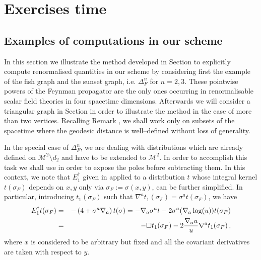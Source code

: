 \documentclass[10pt]{book}
\newcommand{\Mcal}{\mathcal{M}}
\theoremstyle{break}
\begin{document}
\chapter{Exercises time}



\section{Examples of computations in our scheme}


In this section we illustrate the method developed in Section %
to explicitly compute renormalised quantities in our scheme by considering first the example of the fish graph and the sunset graph, i.e. $\Delta^n_F$ for $n=2,3$. These pointwise powers of the Feynman propagator are the only ones occurring in renormalisable scalar field theories in four spacetime dimensions. Afterwards we will consider a triangular graph in Section %
in order to illustrate the method in the case of more than two vertices. Recalling Remark %
, we shall work only on subsets of the spacetime where the geodesic distance is well--defined without loss of generality.

In the special case of $\Delta^n_F$, we are dealing with distributions which are already defined on $\Mcal^2\setminus d_2$ and have to be extended to $\Mcal^2$. In order to accomplish this task we shall use %
in order to expose the poles before subtracting them. In this context, we note that  $E^\dagger_1$ given in %
applied to a distribution $t$ whose integral kernel $t(\sigma_F)$ depends on $x,y$  only via $\sigma_F:=\sigma(x,y)$, can be further simplified. 
In particular, introducing $t_1(\sigma_F)$ such that $\nabla^a t_1(\sigma_F) = \sigma^a t(\sigma_F)$, we have 
\begin{eqnarray*}
E^\dagger_1 t(\sigma_F)&=& -\left( 4 +  \sigma^a\nabla_a   \right)t(\sigma)  = 
- \nabla_a \sigma^a  t - 2 \sigma^a (\nabla_a \log (u))   t(\sigma_F)  \\ &=&
- \Box t_1(\sigma_F)  - 2  \frac{\nabla_a u}{u}   \nabla^a t_1(\sigma_F)\,,\notag  
\end{eqnarray*}
where $x$ is considered to be arbitrary but fixed and all the covariant derivatives are taken with respect to $y$.
\end{document}
